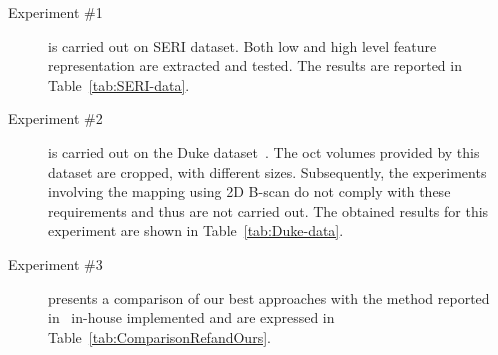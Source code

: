 \begin{description}

\item[Experiment \#1] is carried out on SERI dataset. Both low and high level feature representation are extracted and tested. The results are reported in Table~\ref{tab:SERI-data}.

\item[Experiment \#2] is carried out on the Duke dataset~\cite{Srinivasan2014}. The \ac{oct} volumes provided by this dataset are cropped, with different sizes. 
Subsequently, the experiments involving the mapping using 2D B-scan do not comply with these requirements and thus are not carried out.
The obtained results for this experiment are shown in Table~\ref{tab:Duke-data}.

\item[Experiment \#3] presents a comparison of our best approaches with the method reported in~\cite{Venhuizen2015} in-house implemented and are expressed in Table~\ref{tab:ComparisonRefandOurs}.

\end{description}


